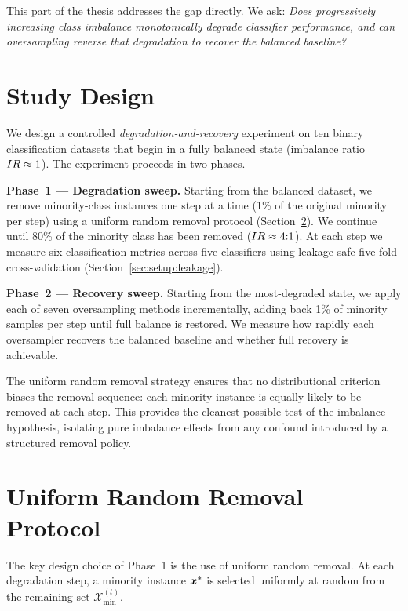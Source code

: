 This part of the thesis addresses the gap directly.
We ask: \emph{Does progressively increasing class imbalance monotonically degrade classifier performance, and can oversampling reverse that degradation to recover the balanced baseline?}


\section{Study Design}
\label{sec:causal:design}

We design a controlled \emph{degradation-and-recovery} experiment on ten binary classification datasets that begin in a fully balanced state (imbalance ratio $IR \approx 1$).
The experiment proceeds in two phases.

\textbf{Phase~1 --- Degradation sweep.}
Starting from the balanced dataset, we remove minority-class instances one step at a time (1\% of the original minority per step) using a uniform random removal protocol (Section~\ref{sec:causal:random_removal}).
We continue until 80\% of the minority class has been removed ($IR \approx 4{:}1$).
At each step we measure six classification metrics across five classifiers using leakage-safe five-fold cross-validation (Section~\ref{sec:setup:leakage}).

\textbf{Phase~2 --- Recovery sweep.}
Starting from the most-degraded state, we apply each of seven oversampling methods incrementally, adding back 1\% of minority samples per step until full balance is restored.
We measure how rapidly each oversampler recovers the balanced baseline and whether full recovery is achievable.

The uniform random removal strategy ensures that no distributional criterion biases the removal sequence: each minority instance is equally likely to be removed at each step.
This provides the cleanest possible test of the imbalance hypothesis, isolating pure imbalance effects from any confound introduced by a structured removal policy.


\section{Uniform Random Removal Protocol}
\label{sec:causal:random_removal}

The key design choice of Phase~1 is the use of uniform random removal.
At each degradation step, a minority instance $\bm{x}^*$ is selected uniformly at random from the remaining set $\mathcal{X}_{\min}^{(t)}$.

